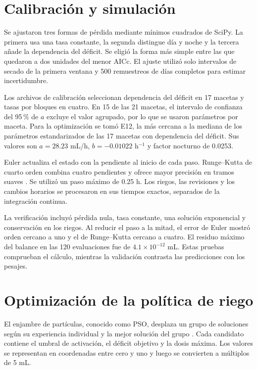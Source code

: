 \documentclass[12pt]{article}
\begin{document}
\section{Calibración y simulación}

Se ajustaron tres formas de pérdida mediante mínimos cuadrados de SciPy. La primera usa una tasa constante, la segunda distingue día y noche y la tercera añade la dependencia del déficit. Se eligió la forma más simple entre las que quedaron a dos unidades del menor AICc. El ajuste utilizó solo intervalos de secado de la primera ventana y 500 remuestreos de días completos para estimar incertidumbre.

Los archivos de calibración seleccionan dependencia del déficit en 17 macetas y tasas por bloques en cuatro. En 15 de las 21 macetas, el intervalo de confianza del 95\,\% de $a$ excluye el valor agrupado, por lo que se usaron parámetros por maceta. Para la optimización se tomó E12, la más cercana a la mediana de los parámetros estandarizados de las 17 macetas con dependencia del déficit. Sus valores son $a=28.23$ mL/h, $b=-0.01022$ h$^{-1}$ y factor nocturno de 0.0253.

Euler actualiza el estado con la pendiente al inicio de cada paso. Runge--Kutta de cuarto orden combina cuatro pendientes y ofrece mayor precisión en tramos suaves \cite{euler,rk4}. Se utilizó un paso máximo de 0.25 h. Los riegos, las revisiones y los cambios horarios se procesaron en sus tiempos exactos, separados de la integración continua.

La verificación incluyó pérdida nula, tasa constante, una solución exponencial y conservación en los riegos. Al reducir el paso a la mitad, el error de Euler mostró orden cercano a uno y el de Runge--Kutta cercano a cuatro. El residuo máximo del balance en las 120 evaluaciones fue de $4.1\times10^{-12}$ mL. Estas pruebas comprueban el cálculo, mientras la validación contrasta las predicciones con los pesajes.

\section{Optimización de la política de riego}

El enjambre de partículas, conocido como PSO, desplaza un grupo de soluciones según su experiencia individual y la mejor solución del grupo \cite{kennedy}. Cada candidato contiene el umbral de activación, el déficit objetivo y la dosis máxima. Los valores se representan en coordenadas entre cero y uno y luego se convierten a múltiplos de 5 mL.
\end{document}
